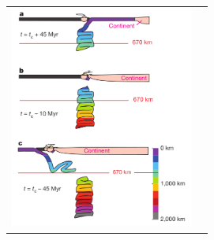 \begin{tabular}{p{8cm}p{8cm}}
\includegraphics[width=6cm]{images/beautiful/simi13} \cite{simi13} &
\end{tabular}



\begin{center}
\end{center}
